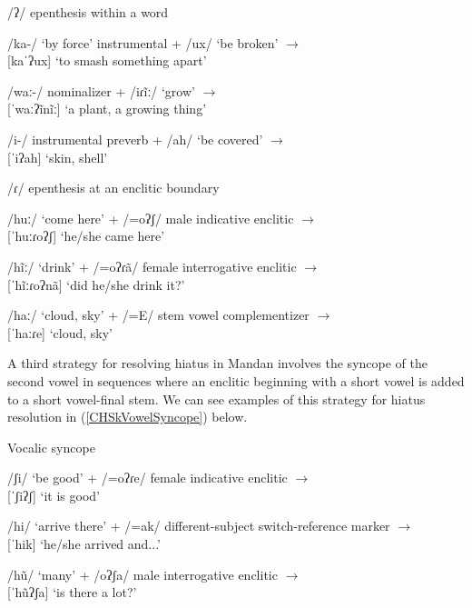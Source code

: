 \begin{exe}
    \item\label{CHSkEpenthesis1} /ʔ/ epenthesis within a word

    \begin{xlist}
        \item\label{CHSkEpenthesis1a} /ka-/ `by force' instrumental + /ux/ `be broken' $\to$\\
        {[}kaˈʔux] `to smash something apart'
        \item\label{CHSkEpenthesis1b} /waː-/ nominalizer + /iɾĩː/ `grow' $\to$\\
        {[}ˈwaːʔĩnĩː] `a plant, a growing thing'
        \item\label{CHSkEpenthesis1c} /i-/ instrumental preverb + /ah/ `be covered' $\to$\\
        {[}ˈiʔah] `skin, shell'
    \end{xlist}
    \item\label{CHSkEpenthesis2} /ɾ/ epenthesis at an enclitic boundary

    \begin{xlist}
        \item\label{CHSkEpenthesis2a} /huː/ `come here' + /=oʔʃ/ male indicative enclitic $\to$\\
        {[}ˈhuːɾoʔʃ] `he/she came here'
        \item\label{CHSkEpenthesis2b} /hĩː/ `drink' + /=oʔɾã/ female interrogative enclitic $\to$\\
        {[}ˈhĩːɾoʔnã] `did he/she drink it?'
        \item\label{CHSkEpenthesis2c} /haː/ `cloud, sky' + /=E/ stem vowel complementizer $\to$\\
        {[}ˈhaːɾe] `cloud, sky'
    \end{xlist}
\end{exe}

A third strategy for resolving hiatus in Mandan involves the syncope of the second vowel in sequences where an enclitic beginning with a short vowel is added to a short vowel-final stem. We can see examples of this strategy for hiatus resolution in (\ref{CHSkVowelSyncope}) below.

\begin{exe}
    \item\label{CHSkVowelSyncope} Vocalic syncope

    \begin{xlist}
        \item\label{CHSkVowelSyncopeA} /ʃi/ `be good' + /=oʔɾe/ female indicative enclitic $\to$\\
        {[}ˈʃiʔʃ] `it is good'
        \item\label{CHSkVowelSyncopeB} /hi/ `arrive there' + /=ak/ different-subject switch-reference marker $\to$\\
        {[}ˈhik] `he/she arrived and...'
        \item\label{CHSkVowelSyncopeC} /hũ/ `many' + /oʔʃa/ male interrogative enclitic $\to$\\
        {[}ˈhũʔʃa] `is there a lot?'
    \end{xlist}
\end{exe}

